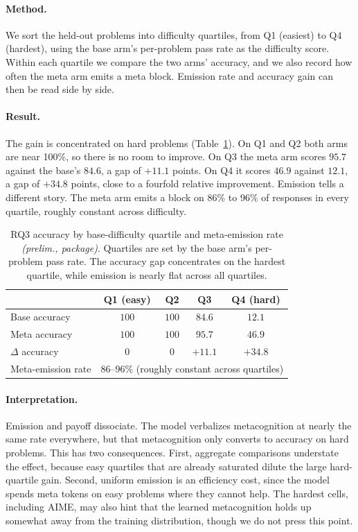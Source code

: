 \paragraph{Method.} We sort the held-out problems into difficulty quartiles,
from Q1 (easiest) to Q4 (hardest), using the base arm's per-problem pass rate as
the difficulty score. Within each quartile we compare the two arms' accuracy,
and we also record how often the meta arm emits a meta block. Emission rate and
accuracy gain can then be read side by side.

\paragraph{Result.} The gain is concentrated on hard problems (Table~\ref{tab:t3}).
On Q1 and Q2 both arms are near 100\%, so there is no room to improve. On Q3 the
meta arm scores $95.7$ against the base's $84.6$, a gap of $+11.1$ points. On Q4
it scores $46.9$ against $12.1$, a gap of $+34.8$ points, close to a fourfold
relative improvement. Emission tells a different story. The meta arm emits a
block on 86\% to 96\% of responses in every quartile, roughly constant across
difficulty.

\begin{table}[t]
\caption{RQ3 accuracy by base-difficulty quartile and meta-emission rate
\emph{(prelim., package)}. Quartiles are set by the base arm's per-problem pass
rate. The accuracy gap concentrates on the hardest quartile, while emission is
nearly flat across all quartiles.}
\label{tab:t3}
\begin{center}
\small
\begin{tabular}{lcccc}
\toprule
 & Q1 (easy) & Q2 & Q3 & Q4 (hard) \\
\midrule
Base accuracy    & $100$ & $100$ & $84.6$ & $12.1$ \\
Meta accuracy    & $100$ & $100$ & $95.7$ & $46.9$ \\
$\Delta$ accuracy & $0$   & $0$   & $+11.1$ & $\mathbf{+34.8}$ \\
Meta-emission rate & \multicolumn{4}{c}{$86$--$96\%$ (roughly constant across quartiles)} \\
\bottomrule
\end{tabular}
\end{center}
\end{table}

\paragraph{Interpretation.} Emission and payoff dissociate. The model verbalizes
metacognition at nearly the same rate everywhere, but that metacognition only
converts to accuracy on hard problems. This has two consequences. First,
aggregate comparisons understate the effect, because easy quartiles that are
already saturated dilute the large hard-quartile gain. Second, uniform emission
is an efficiency cost, since the model spends meta tokens on easy problems where
they cannot help. The hardest cells, including AIME, may also hint that the
learned metacognition holds up somewhat away from the training distribution,
though we do not press this point.

